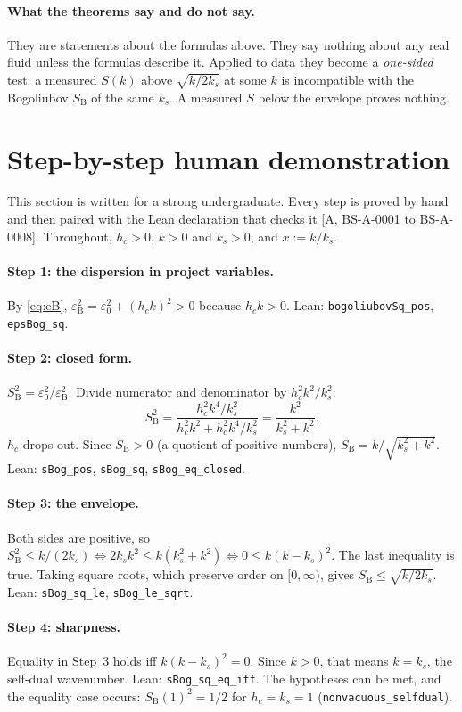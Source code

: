 \documentclass[11pt]{article}
\theoremstyle{remark}
\newcommand{\tier}[1]{\textsf{[#1]}}
\newcommand{\lean}[1]{\texttt{#1}}
\newcommand{\ks}{k_s}
\newcommand{\SB}{S_{\mathrm B}}
\newcommand{\eB}{\varepsilon_{\mathrm B}}
\begin{document}
\paragraph{What the theorems say and do not say.} They are statements about the formulas above. They say nothing
about any real fluid unless the formulas describe it. Applied to data they become a \emph{one-sided} test: a measured
$S(k)$ above $\sqrt{k/2\ks}$ at some $k$ is incompatible with the Bogoliubov $\SB$ of the same $\ks$. A measured $S$
below the envelope proves nothing.

\section{Step-by-step human demonstration}\label{sec:human}
This section is written for a strong undergraduate. Every step is proved by hand and then paired with the Lean
declaration that checks it \tier{A, BS-A-0001 to BS-A-0008}. Throughout, $h_c>0$, $k>0$ and $\ks>0$, and
$x:=k/\ks$.

\paragraph{Step 1: the dispersion in project variables.} By \eqref{eq:eB},
$\eB^2=\varepsilon_0^2+(h_ck)^2>0$ because $h_ck>0$. Lean: \lean{bogoliubovSq\_pos}, \lean{epsBog\_sq}.

\paragraph{Step 2: closed form.} $\SB^2=\varepsilon_0^2/\eB^2$. Divide numerator and denominator by $h_c^2k^2/\ks^2$:
\[
\SB^2=\frac{h_c^2k^4/\ks^2}{h_c^2k^2+h_c^2k^4/\ks^2}=\frac{k^2}{\ks^2+k^2}.
\]
$h_c$ drops out. Since $\SB>0$ (a quotient of positive numbers), $\SB=k/\sqrt{\ks^2+k^2}$. Lean: \lean{sBog\_pos},
\lean{sBog\_sq}, \lean{sBog\_eq\_closed}.

\paragraph{Step 3: the envelope.} Both sides are positive, so
$\SB^2\le k/(2\ks)\iff 2\ks k^2\le k(\ks^2+k^2)\iff 0\le k(k-\ks)^2$.
The last inequality is true. Taking square roots, which preserve order on $[0,\infty)$, gives
$\SB\le\sqrt{k/2\ks}$. Lean: \lean{sBog\_sq\_le}, \lean{sBog\_le\_sqrt}.

\paragraph{Step 4: sharpness.} Equality in Step~3 holds iff $k(k-\ks)^2=0$. Since $k>0$, that means $k=\ks$,
the self-dual wavenumber. Lean: \lean{sBog\_sq\_eq\_iff}. The hypotheses can be met, and the equality case occurs:
$\SB(1)^2=1/2$ for $h_c=\ks=1$ (\lean{nonvacuous\_selfdual}).
\end{document}
